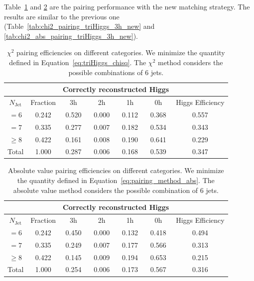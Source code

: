\documentclass[12pt]{article}
\begin{document}
    Table~\ref{tab:chi2_pairing_triHiggs_3h_new_match} and \ref{tab:abs_pairing_triHiggs_3h_new_match} are the pairing performance with the new matching strategy. The results are similar to the previous one (Table~\ref{tab:chi2_pairing_triHiggs_3h_new} and \ref{tab:chi2_abs_pairing_triHiggs_3h_new}).
    \begin{table}[htpb]
		\centering
        \caption{$\chi^2$ pairing efficiencies on different categories. We minimize the quantity defined in Equation~\ref{eq:triHiggs_chisq}. The $\chi^2$ method considers the possible combinations of 6 jets.}
		\label{tab:chi2_pairing_triHiggs_3h_new_match}
		\begin{tabular}{c|c|cccc|c}
        \multicolumn{1}{l|}{} &          & \multicolumn{4}{c|}{Correctly reconstructed Higgs} & \multicolumn{1}{l}{} \\ \hline
        $N_\text{Jet}$        & Fraction & 3h          & 2h         & 1h         & 0h         & Higgs Efficiency     \\ \hline
        $=6$                  & 0.242 & 0.520 & 0.000 & 0.112 & 0.368 & 0.557 \\
        $=7$                  & 0.335 & 0.277 & 0.007 & 0.182 & 0.534 & 0.343 \\
        $\ge 8$               & 0.422 & 0.161 & 0.008 & 0.190 & 0.641 & 0.229 \\ \hline
        Total                 & 1.000 & 0.287 & 0.006 & 0.168 & 0.539 & 0.347 
		\end{tabular}
	\end{table}
    \begin{table}[htpb]
		\centering
		\caption{Absolute value pairing efficiencies on different categories. We minimize the quantity defined in Equation~\ref{eq:pairing_method_abs}. The absolute value method considers the possible combination of 6 jets.}
		\label{tab:abs_pairing_triHiggs_3h_new_match}
		\begin{tabular}{c|c|cccc|c}
        \multicolumn{1}{l|}{} &          & \multicolumn{4}{c|}{Correctly reconstructed Higgs} & \multicolumn{1}{l}{} \\ \hline
        $N_\text{Jet}$        & Fraction & 3h          & 2h         & 1h         & 0h         & Higgs Efficiency     \\ \hline
        $=6$                  & 0.242 & 0.450 & 0.000 & 0.132 & 0.418 & 0.494 \\
        $=7$                  & 0.335 & 0.249 & 0.007 & 0.177 & 0.566 & 0.313 \\
        $\ge 8$               & 0.422 & 0.145 & 0.009 & 0.194 & 0.653 & 0.215 \\ \hline
        Total                 & 1.000 & 0.254 & 0.006 & 0.173 & 0.567 & 0.316 
		\end{tabular}
	\end{table}
\end{document}

